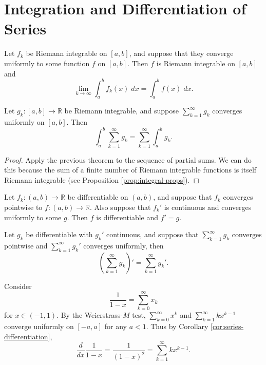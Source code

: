 \documentclass[twoside,10pt]{report}
\begin{document}
\section{Integration and Differentiation of Series}

\begin{thrm}[]
	Let $f_k$ be Riemann integrable on $[a,b] $, and suppose that they converge uniformly to some function $f$ on $[a,b]$. Then $f$ is Riemann integrable on $[a,b]$ and
	\[
		\lim_{k \to \infty} \int_{a}^{b} f_k(x) \;dx = \int_{a}^{b} f(x)\;dx.
	\] 
\end{thrm}

\begin{cor}
	Let $g_k : [a,b] \to \mathbb{R}$ be Riemann integrable, and suppose $\sum_{k=1}^{\infty} g_k$ converges uniformly on $[a,b]$. Then
	\[
		\int_{a}^{b} \sum_{k=1}^{\infty} g_k = \sum_{k=1}^{\infty} \int_{a}^{b} g_k.
	\] 
\end{cor}
\begin{proof}
	Apply the previous theorem to the sequence of partial sums. We can do this because the sum of a finite number of Riemann integrable functions is itself Riemann integrable (see Proposition \ref{prop:integral-props}).
\end{proof}

\begin{thrm}{}{}
	Let $f_k:(a,b) \to \mathbb{R}$ be differentiable on $(a,b)$, and suppose that $f_k$ converges pointwise to $f:(a,b) \to \mathbb{R}$. Also suppose that $f_k'$ is continuous and converges uniformly to some $g$. Then $f$ is differentiable and $f'=g$.
\end{thrm}

\begin{cor}
	\label{cor:series-differentiation}
	Let $g_k$ be differentiable with $g_k'$ continuous, and suppose that $\sum_{k=1}^{\infty} g_k$ converges pointwise and $\sum_{k=1}^{\infty} g_k'$ converges uniformly, then
	\[
		\left( \sum_{k=1}^{\infty} g_k \right)' = \sum_{k=1}^{\infty} g_k'.
	\] 
\end{cor}

\begin{ex}{}{}
	Consider \[ \frac{1}{1-x} = \sum_{k=0}^{\infty} x_k\] for $x \in (-1, 1)$. By the Weierstrass-$M$ test, $\sum_{k=0}^{\infty} x^k$ and $\sum_{k=1}^{\infty} k x^{k-1}$ converge uniformly on $[-a,a]$ for any $a <1$. Thus by Corollary \ref{cor:series-differentiation},
	\[
		\frac{d }{d x} \frac{1}{1-x} = \frac{1}{(1-x)^2} = \sum_{k=1}^{\infty} k x^{k-1}.
	\] 
\end{ex}
\end{document}
